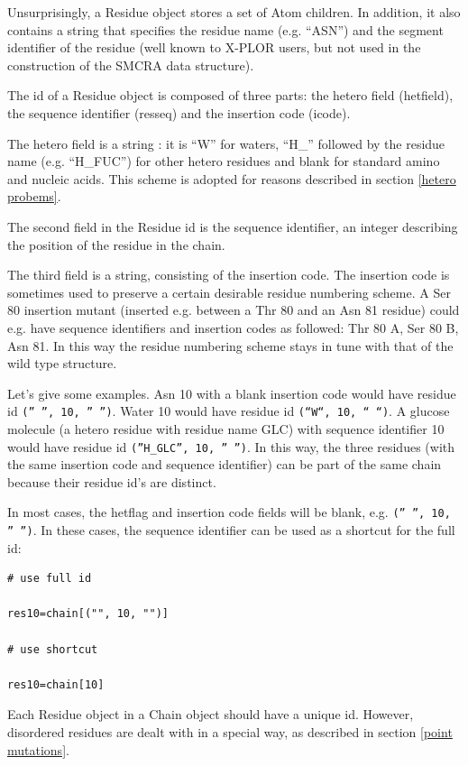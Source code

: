 \documentclass{report}
\begin{document}
Unsurprisingly, a Residue object stores a set of Atom children. In addition,
it also contains a string that specifies the residue name (e.g. {}``ASN{}'')
and the segment identifier of the residue (well known to X-PLOR users, but not
used in the construction of the SMCRA data structure). 

The id of a Residue object is composed of three parts: the hetero field (hetfield),
the sequence identifier (resseq) and the insertion code (icode). 

The hetero field is a string : it is {}``W{}'' for waters, {}``H\_{}'' followed
by the residue name (e.g. {}``H\_FUC{}'') for other hetero residues and blank
for standard amino and nucleic acids. This scheme is adopted for reasons described
in section \ref{hetero probems}.

The second field in the Residue id is the sequence identifier, an integer describing
the position of the residue in the chain.

The third field is a string, consisting of the insertion code. The insertion
code is sometimes used to preserve a certain desirable residue numbering scheme.
A Ser 80 insertion mutant (inserted e.g. between a Thr 80 and an Asn 81 residue)
could e.g. have sequence identifiers and insertion codes as followed: Thr 80
A, Ser 80 B, Asn 81. In this way the residue numbering scheme stays in tune
with that of the wild type structure. 

Let's give some examples. Asn 10 with a blank insertion code would have residue
id {\tt ('' '', 10, '' '')}. Water 10 would have residue id {\tt (``W``, 10, `` ``)}.
A glucose molecule (a hetero residue with residue name GLC) with sequence identifier
10 would have residue id {\tt (''H\_GLC'', 10, '' '')}. In this way, the three
residues (with the same insertion code and sequence identifier) can be part
of the same chain because their residue id's are distinct.

In most cases, the hetflag and insertion code fields will be blank, e.g. {\tt ('' '', 10, '' '')}.
In these cases, the sequence identifier can be used as a shortcut for the full
id:

\begin{verbatim}
# use full id

res10=chain[("", 10, "")]

# use shortcut 

res10=chain[10]
\end{verbatim}

Each Residue object in a Chain object should have a unique id. However, disordered
residues are dealt with in a special way, as described in section \ref{point mutations}.
\end{document}

